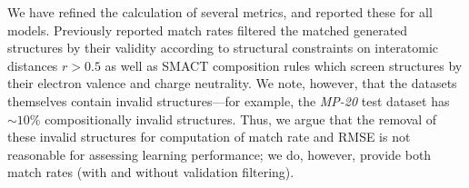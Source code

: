 We have refined the calculation of several metrics, and reported these for all models.
Previously reported match rates filtered the matched generated structures by their validity according to structural constraints on interatomic distances $r>0.5$\text{\AA} as well as SMACT composition rules \citep{davies_smact_2019} which screen structures by their electron valence and charge neutrality.
We note, however, that the datasets themselves contain invalid structures---for example, the \textit{MP-20} test dataset has $\sim 10$\% compositionally invalid structures. 
Thus, we argue that the removal of these invalid structures for computation of match rate and RMSE is not reasonable for assessing learning performance; we do, however, provide both match rates (with and without validation filtering).






